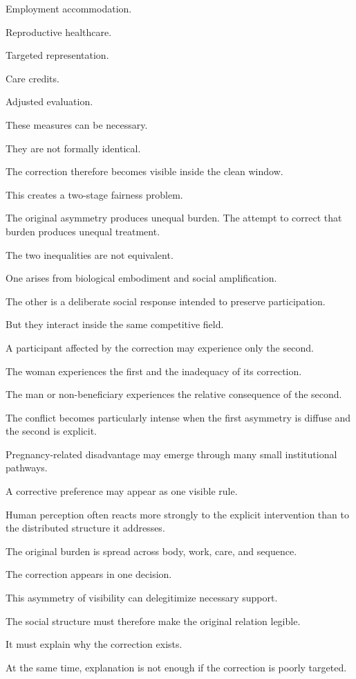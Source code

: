 Employment accommodation.

Reproductive healthcare.

Targeted representation.

Care credits.

Adjusted evaluation.

These measures can be necessary.

They are not formally identical.

The correction therefore becomes visible inside the clean window.

This creates a two-stage fairness problem.

The original asymmetry produces unequal burden. The attempt to correct that burden produces unequal treatment.

The two inequalities are not equivalent.

One arises from biological embodiment and social amplification.

The other is a deliberate social response intended to preserve participation.

But they interact inside the same competitive field.

A participant affected by the correction may experience only the second.

The woman experiences the first and the inadequacy of its correction.

The man or non-beneficiary experiences the relative consequence of the second.

The conflict becomes particularly intense when the first asymmetry is diffuse and the second is explicit.

Pregnancy-related disadvantage may emerge through many small institutional pathways.

A corrective preference may appear as one visible rule.

Human perception often reacts more strongly to the explicit intervention than to the distributed structure it addresses.

The original burden is spread across body, work, care, and sequence.

The correction appears in one decision.

This asymmetry of visibility can delegitimize necessary support.

The social structure must therefore make the original relation legible.

It must explain why the correction exists.

At the same time, explanation is not enough if the correction is poorly targeted.

